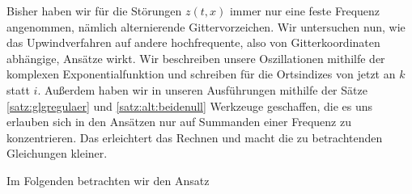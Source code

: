 
Bisher haben wir für die Störungen $z(t,x)$ immer nur eine feste Frequenz angenommen, nämlich alternierende Gittervorzeichen.
Wir untersuchen nun, wie das Upwindverfahren auf andere hochfrequente, also von Gitterkoordinaten abhängige, Ansätze wirkt.
Wir beschreiben unsere Oszillationen mithilfe der komplexen Exponentialfunktion und schreiben für die Ortsindizes von jetzt an $k$ statt $i$.
Außerdem haben wir in unseren Ausführungen mithilfe der Sätze \ref{satz:glgregulaer} und \ref{satz:alt:beidenull} Werkzeuge geschaffen, die es uns erlauben sich in den Ansätzen nur auf Summanden einer Frequenz zu konzentrieren.
Das erleichtert das Rechnen und macht die zu betrachtenden Gleichungen kleiner.


Im Folgenden betrachten wir den Ansatz




